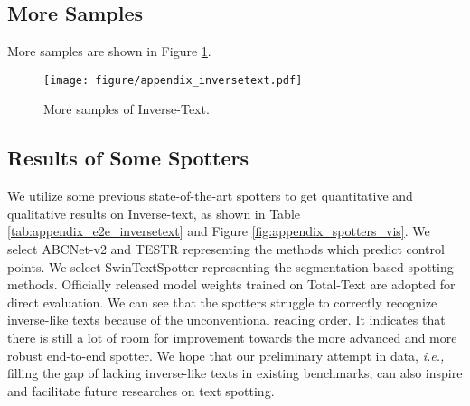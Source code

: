 \documentclass[letterpaper]{article} \usepackage{aaai23}  \usepackage{times}  \usepackage{helvet}  \usepackage{courier}  \usepackage[hyphens]{url}  \usepackage{graphicx} \urlstyle{rm}
\begin{document}
\subsection{More Samples}
\label{subsec:more_samples}
More samples are shown in Figure \ref{fig:appendix_inversetext}.
\begin{figure}[!t]
    \centering
    \texttt{[image: figure/appendix\_inversetext.pdf]}
    \caption{More samples of Inverse-Text.}
    \label{fig:appendix_inversetext}
\end{figure}


\subsection{Results of Some Spotters}
We utilize some previous state-of-the-art spotters to get quantitative and qualitative results on Inverse-text, as shown in Table \ref{tab:appendix_e2e_inversetext} and Figure \ref{fig:appendix_spotters_vis}. We select ABCNet-v2 \cite{9525302} and TESTR \cite{zhang2022text} representing the methods which predict control points. We select SwinTextSpotter \cite{huang2022swintextspotter} representing the segmentation-based spotting methods. Officially released model weights trained on Total-Text \cite{ch2020total} are adopted for direct evaluation. We can see that the spotters struggle to correctly recognize inverse-like texts because of the unconventional reading order. It indicates that there is still a lot of room for improvement towards the more advanced and more robust end-to-end spotter. We hope that our preliminary attempt in data, \textit{i.e.,} filling the gap of lacking inverse-like texts in existing benchmarks, can also inspire and facilitate future researches on text spotting.

\begin{table}[t!]
    \centering
    \caption{Results of spotters on Inverse-Text. ``None'' and ``Full'' indicate end-to-end results without using lexicon and with lexicon, respectively.}
    \label{tab:appendix_e2e_inversetext}
\end{table}
\end{document}
